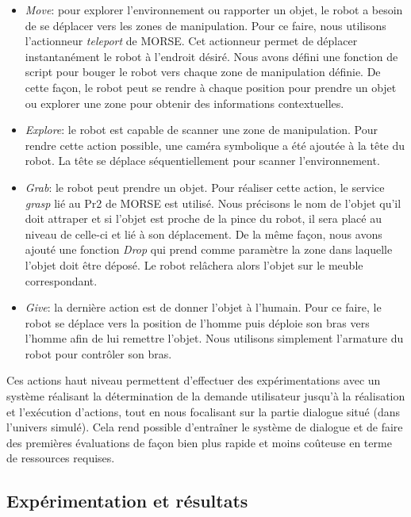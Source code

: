 \documentclass[a4paper,11pt,twoside]{StyleThese}
\begin{document}
\begin{itemize}

\item \textit{Move}: pour explorer l'environnement ou rapporter un objet, le robot a besoin de se déplacer vers les zones de manipulation. Pour ce faire, nous utilisons l'actionneur \textit{teleport} de MORSE. Cet actionneur permet de déplacer instantanément le robot à l'endroit désiré. Nous avons défini une fonction de script pour bouger le robot vers chaque zone de manipulation définie. De cette façon, le robot peut se rendre à chaque position pour prendre un objet ou explorer une zone pour obtenir des informations contextuelles.

\item \textit{Explore}: le robot est capable de scanner une zone de manipulation. Pour rendre cette action possible, une caméra symbolique a été ajoutée à la tête du robot. La tête se déplace séquentiellement pour scanner l'environnement.

\item \textit{Grab}: le robot peut prendre un objet. Pour réaliser cette action, le service \textit{grasp} lié au Pr2 de MORSE est utilisé. Nous précisons le nom de l'objet qu'il doit attraper et si l'objet est proche de la pince du robot, il sera placé au niveau de celle-ci et lié à son déplacement. De la même façon, nous avons ajouté une fonction \textit{Drop} qui prend comme paramètre la zone dans laquelle l'objet doit être déposé. Le robot relâchera alors l'objet sur le meuble correspondant.

\item \textit{Give}: la dernière action est de donner l'objet à l'humain. Pour ce faire, le robot se déplace vers la position de l'homme puis déploie son bras vers l'homme afin de lui remettre l'objet. Nous utilisons simplement l'armature du robot pour contrôler son bras.
\end{itemize}

Ces actions haut niveau permettent d'effectuer des expérimentations avec un système réalisant la détermination de la demande utilisateur jusqu'à la réalisation et l'exécution d'actions, tout en nous focalisant sur la partie dialogue situé (dans l'univers simulé). Cela rend possible d'entraîner le système de dialogue et de faire des premières évaluations de façon bien plus rapide et moins coûteuse en terme de ressources requises.

\subsection{Expérimentation et résultats}
\end{document}
